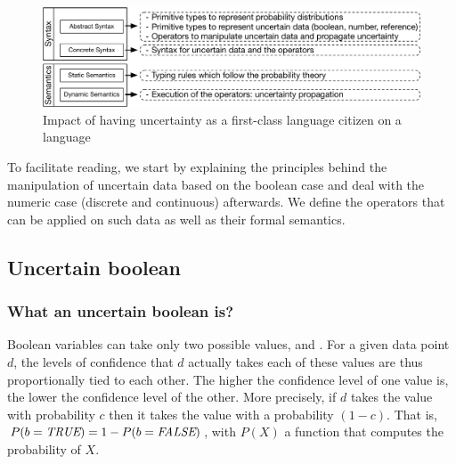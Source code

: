 \begin{figure}
	\centering
	\includegraphics[width=\linewidth]{img/chapt-aintea/duc/sumup-contrib}
	\caption{Impact of having uncertainty as a first-class language citizen on a language}
	\label{fig:contrib-summary}
\end{figure}


To facilitate reading, we start by explaining the principles behind the manipulation of uncertain data based on the boolean case and deal with the numeric case (discrete and continuous) afterwards. 
We define the operators that can be applied on such data as well as their formal semantics.

\vfill

\subsection{Uncertain boolean}

\subsubsection{What an uncertain boolean is?}
Boolean variables can take only two possible values, \true{} and \false{}.
For a given data point $d$, the levels of confidence that $d$ actually takes each of these values are thus proportionally tied to each other. The higher the confidence level of one value is, the lower the confidence level of the other.
More precisely, if $d$ takes the value \true{} with probability $c$ then it takes the value \false{} with a probability $(1-c)$.
That is, $P(b=\textit{TRUE}{}) = 1 - P(b=\textit{FALSE}{})$, with $P(X)$ a function that computes the probability of $X$.


